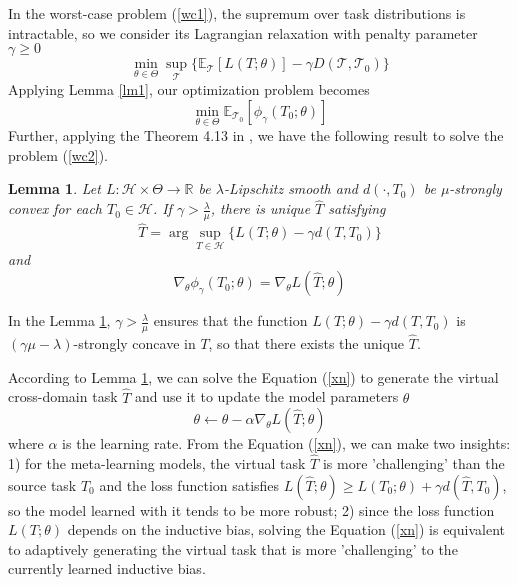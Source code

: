 \documentclass{article}
\newtheorem{lemma}[theorem]{Lemma}
\begin{document}
In the worst-case problem (\ref{wc1}), the supremum over task distributions is intractable, so we consider its Lagrangian relaxation with penalty parameter $\gamma\geq0$
\begin{equation}
   \min_{\theta\in\Theta} \sup_{\mathcal{T}}\{\mathbb{E}_{\mathcal{T}}[L(T;\theta)]-\gamma D(\mathcal{T},\mathcal{T}_0)\}
\end{equation}
Applying Lemma \ref{lm1}, our optimization problem becomes
\begin{equation}\label{wc2}
   \min_{\theta\in\Theta}\mathbb{E}_{\mathcal{T}_0}[\phi_{\gamma}(T_0;\theta)]
\end{equation}
Further, applying the Theorem 4.13 in \cite{bonnans2013perturbation}, we have the following result to solve the problem (\ref{wc2}).
\begin{lemma}\label{lm2}
Let $L:\mathcal{H}\times\Theta\rightarrow\mathbb{R}$ be $\lambda$-Lipschitz smooth and $d(\cdot,T_0)$ be $\mu$-strongly convex for each $T_0\in\mathcal{H}$. If $\gamma>\frac{\lambda}{\mu}$, there is unique $\hat{T}$ satisfying
\begin{equation}\label{xn}
    \hat{T}=\arg\sup_{T\in\mathcal{H}}\{L(T;\theta)-\gamma d(T,T_0)\}
\end{equation}
and 
\begin{equation}
    \nabla_{\theta}\phi_{\gamma}(T_0;\theta)=\nabla_{\theta}L(\hat{T};\theta)
\end{equation}
\end{lemma}
In the Lemma \ref{lm2}, $\gamma>\frac{\lambda}{\mu}$ ensures that the function $L(T;\theta)-\gamma d(T,T_0)$ is $(\gamma\mu-\lambda)$-strongly concave in $T$, so that there exists the unique $\hat{T}$.

According to Lemma \ref{lm2}, we can solve the Equation (\ref{xn}) to generate the virtual cross-domain task $\hat{T}$ and use it to update the model parameters $\theta$
\begin{equation}
    \theta \leftarrow \theta - \alpha \nabla_{\theta} L(\hat{T};\theta)
\end{equation}
where $\alpha$ is the learning rate. From the Equation (\ref{xn}), we can make two insights: 1) for the meta-learning models, the virtual task $\hat{T}$ is more 'challenging' than the source task $T_0$ and the loss function satisfies $L(\hat{T};\theta)\geq L(T_0;\theta)+\gamma d(\hat{T},T_0)$, so the model learned with it tends to be more robust; 2) since the loss function $L(T;\theta)$ depends on the inductive bias, solving the Equation (\ref{xn}) is equivalent to adaptively generating the virtual task that is more 'challenging' to the currently learned inductive bias.
\end{document}
